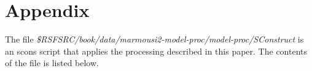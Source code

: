 \newpage
\section{Appendix}

The file \emph{\$RSFSRC/book/data/marmousi2-model-proc/model-proc/SConstruct} 
is an scons script that applies the processing described in this paper.  The 
contents of the file is listed below.

\tiny

\normalsize







 
